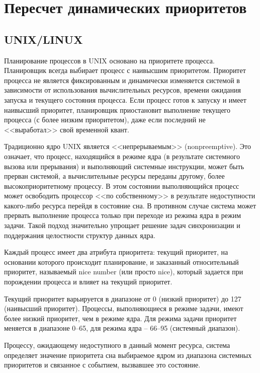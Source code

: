 \section{Пересчет динамических приоритетов}

\subsection{UNIX/LINUX}

Планирование процессов в UNIX основано на приоритете процесса.
Планировщик всегда выбирает процесс с наивысшим приоритетом. Приоритет
процесса не является фиксированным и динамически изменяется системой
в зависимости от использования вычислительных ресурсов, времени
ожидания запуска и текущего состояния процесса. Если процесс готов к
запуску и имеет наивысший приоритет, планировщик приостановит
выполнение текущего процесса (с более низким приоритетом), даже
если последний не <<выработал>> свой временной квант.

Традиционно ядро UNIX является <<непрерываемым>> (nonpreemptive).
Это означает, что процесс, находящийся в режиме ядра (в результате
системного вызова или прерывания) и выполняющий системные инструкции,
может быть прерван системой, а вычислительные ресурсы переданы другому,
более высокоприоритетному процессу. В этом состоянии выполняющийся
процесс может освободить процессор <<по собственному>> в результате
недоступности какого-либо ресурса перейдя в состояние сна. В противном
случае система может прервать выполнение процесса только при переходе
из режима ядра в режим задачи. Такой подход значительно упрощает
решение задач синхронизации и поддержания целостности структур данных
ядра.

Каждый процесс имеет два атрибута приоритета: текущий приоритет, на
основании которого происходит планирование, и заказанный
относительный приоритет, называемый nice number (или просто nice),
который задается при порождении процесса и влияет на текущий приоритет.

Текущий приоритет варьируется в диапазоне от 0 (низкий приоритет)
до 127 (наивысший приоритет). Процессы, выполняющиеся в режиме
задачи, имеют более низкий приоритет, чем в режиме ядра. Для режима
задачи приоритет меняется в диапазоне 0–65, для режима ядра --
66–95 (системный диапазон).

Процессу, ожидающему недоступного в данный момент ресурса, система
определяет значение приоритета сна выбираемое ядром из диапазона
системных приоритетов и связанное с событием, вызвавшее это состояние.

